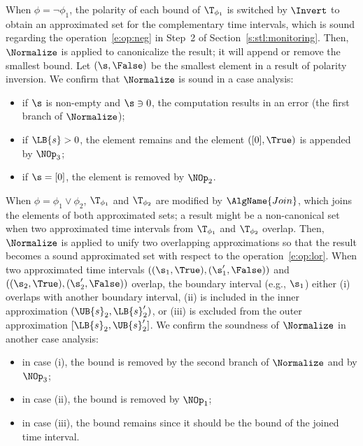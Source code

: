 \documentclass[paper]{ieice}
\newcommand{\Todo}[1]{}
\begin{document}
When $\phi = \neg \phi_1$, the polarity of each bound of $\T_{\phi_1}$ is switched by $\Invert$ to obtain an approximated set for the complementary time intervals, which is sound regarding the operation~\eqref{e:op:neg} in Step~2 of Section~\ref{s:stl:monitoring}.
Then, $\Normalize$ is applied to canonicalize the result;
it will append or remove the smallest bound.
Let $(\s,\False)$ be the smallest element in a result of polarity inversion.
We confirm that $\Normalize$ is sound in a case analysis:
\begin{itemize}
\item if $\s$ is non-empty and $\s \ni 0$, the computation results in an error (the first branch of $\Normalize$);
\item if $\LB{s} > 0$, the element remains and the element $([0],\True)$ is appended by $\NOp_3$;
\item if $\s = [0]$, the element is removed by $\NOp_2$.
\end{itemize}


When $\phi = \phi_1 \lor \phi_2$, $\T_{\phi_1}$ and $\T_{\phi_2}$ are modified by $\AlgName{Join}$, which joins the elements of both approximated sets; a result might be a non-canonical set when two approximated time intervals from $\T_{\phi_1}$ and $\T_{\phi_2}$ overlap.
Then, $\Normalize$ is applied to unify two overlapping approximations so that the result becomes a sound approximated set with respect to the operation~\eqref{e:op:lor}.
When two approximated time intervals $((\s_1,\True),(\s_1',\False))$ and $((\s_2,\True),(\s_2',\False))$ overlap, the boundary interval (e.g., $\s_1$) either (i) overlaps with another boundary interval, (ii) is included in the inner approximation $(\UB{s}_2,\LB{s}_2')$, or (iii) is excluded from the outer approximation $[\LB{s}_2,\UB{s}_2']$. \Todo{Need a figure?}
We confirm the soundness of $\Normalize$ in another case analysis:
\begin{itemize}
\item in case (i), the bound is removed by the second branch of $\Normalize$ and by $\NOp_3$;
\item in case (ii), the bound is removed by $\NOp_1$; 
\item in case (iii), the bound remains since it should be the bound of the joined time interval.
\end{itemize}
\end{document}

